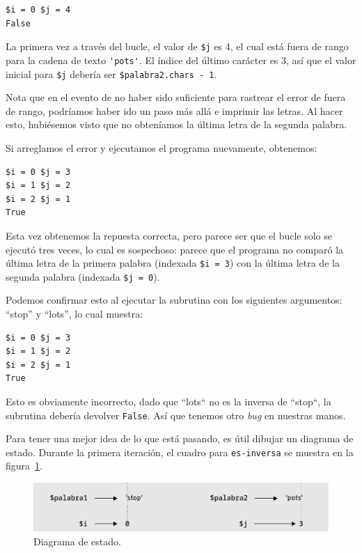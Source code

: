 \begin{lstlisting}
$i = 0 $j = 4
False
\end{lstlisting}
%
La primera vez a través del bucle, el valor de {\tt \$j} es 4,
el cual está fuera de rango para la cadena de texto \verb|'pots'|.
El índice del último carácter es 3,  así que el valor inicial para
{\tt \$j} debería ser {\tt \$palabra2.chars - 1}.

Nota que en el evento de no haber sido suficiente para rastrear 
el error de fuera de rango, podríamos haber ido un paso más allá
e imprimir las letras. Al hacer esto, hubiésemos visto que no
obteníamos la última letra de la segunda palabra.

Si arreglamos el error y ejecutamos el programa nuevamente,
obtenemos:

\begin{lstlisting}
$i = 0 $j = 3
$i = 1 $j = 2
$i = 2 $j = 1
True
\end{lstlisting}
%
Esta vez obtenemos la repuesta correcta, pero parece ser
que el bucle solo se ejecutó tres veces, lo cual es sospechoso:
parece que el programa no comparó la última letra de la 
primera palabra (indexada {\tt \$i = 3}) con la última letra de
la segunda palabra (indexada {\tt \$j = 0}).

Podemos confirmar esto al ejecutar la subrutina con los siguientes
argumentos: ``stop'' y ``lots'', lo cual muestra:

\begin{lstlisting}
$i = 0 $j = 3
$i = 1 $j = 2
$i = 2 $j = 1
True
\end{lstlisting}
%

Esto es obviamente incorrecto, dado que ``lots`` no es la inversa de
``stop``, la subrutina debería devolver {\tt False}. Así que tenemos
otro \emph{bug} en nuestras manos.

Para tener una mejor idea de lo que está pasando, es útil dibujar 
un diagrama de estado. Durante la primera iteración, el cuadro para
\verb|es-inversa| se muestra en la figura~\ref{fig.state4}. 
 

\begin{figure}
\centerline
{\includegraphics[scale=0.5]{figs/state6.pdf}}
\caption{Diagrama de estado.}
\label{fig.state4}
\end{figure}

